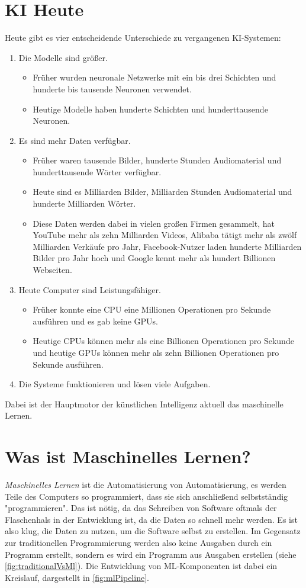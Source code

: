 	\section{KI Heute}
		Heute gibt es vier entscheidende Unterschiede zu vergangenen KI-Systemen:
		\begin{enumerate}
			\item Die Modelle sind größer.
				\begin{itemize}
					\item Früher wurden neuronale Netzwerke mit ein bis drei Schichten und hunderte bis tausende Neuronen verwendet.
					\item Heutige Modelle haben hunderte Schichten und hunderttausende Neuronen.
				\end{itemize}
			\item Es sind mehr Daten verfügbar.
				\begin{itemize}
					\item Früher waren tausende Bilder, hunderte Stunden Audiomaterial und hunderttausende Wörter verfügbar.
					\item Heute sind es Milliarden Bilder, Milliarden Stunden Audiomaterial und hunderte Milliarden Wörter.
					\item Diese Daten werden dabei in vielen großen Firmen gesammelt, \bspw hat YouTube mehr als zehn Milliarden Videos, Alibaba tätigt mehr als zwölf Milliarden Verkäufe pro Jahr, Facebook-Nutzer laden hunderte Milliarden Bilder pro Jahr hoch und Google kennt mehr als hundert Billionen Webseiten.
				\end{itemize}
			\item Heute Computer sind Leistungsfähiger.
				\begin{itemize}
					\item Früher konnte eine CPU \ca eine Millionen Operationen pro Sekunde ausführen und es gab keine GPUs.
					\item Heutige CPUs können mehr als eine Billionen Operationen pro Sekunde und heutige GPUs können mehr als zehn Billionen Operationen pro Sekunde ausführen.
				\end{itemize}
			\item Die Systeme funktionieren und lösen viele Aufgaben.
		\end{enumerate}
		Dabei ist der Hauptmotor der künstlichen Intelligenz aktuell das maschinelle Lernen.

	\section{Was ist Maschinelles Lernen?}
		\emph{Maschinelles Lernen} ist die Automatisierung von Automatisierung, es werden Teile des Computers so programmiert, dass sie sich anschließend selbstständig "programmieren". Das ist nötig, da das Schreiben von Software oftmals der Flaschenhals in der Entwicklung ist, da die Daten so schnell mehr werden. Es ist also klug, die Daten zu nutzen, um die Software selbst zu erstellen. Im Gegensatz zur traditionellen Programmierung werden also keine Ausgaben durch ein Programm erstellt, sondern es wird ein Programm aus Ausgaben erstellen (siehe \autoref{fig:traditionalVsMl}). Die Entwicklung von ML-Komponenten ist dabei ein Kreislauf, dargestellt in \autoref{fig:mlPipeline}.

